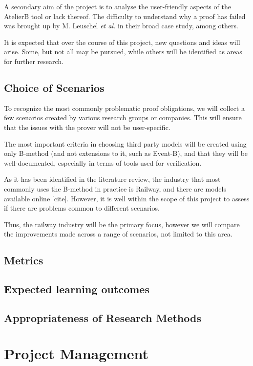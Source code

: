 \documentclass[11pt,journal]{IEEEtran}
\begin{document}
	A secondary aim of the project is to analyse the user-friendly aspects of the AtelierB tool or lack thereof. The difficulty to understand why a proof has failed was brought up by M. Leuschel \emph{et al.} in their broad case study\cite{San Juan metro}, among others.
	
	It is expected that over the course of this project, new questions and ideas will arise. Some, but not all may be pursued, while others will be identified as areas for further research.
	
	\subsection{Choice of Scenarios}
	To recognize the most commonly problematic proof obligations, we will collect a few scenarios created by various research groups or companies. This will ensure that the issues with the prover will not be user-specific. 
	
	The most important criteria in choosing third party models will be created using only B-method (and not extensions to it, such as Event-B), and that they will be well-documented, especially in terms of tools used for verification.
	
	As it has been identified in the literature review, the industry that most commonly uses the B-method in practice is Railway, and there are models available online [cite]. However, it is well within the scope of this project to assess if there are problems common to different scenarios.
	
	Thus, the railway industry will be the primary focus, however we will compare the improvements made across a range of scenarios, not limited to this area.
	
	\subsection{Metrics}
	
	\subsection{Expected learning outcomes}
	
	\subsection{Appropriateness of Research Methods}
	
	\section{Project Management}
	
\end{document}
